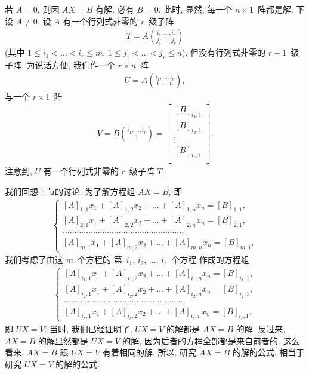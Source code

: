 若 \(A = 0\),
则因 \(AX = B\) 有解,
必有 \(B = 0\).
此时, 显然, 每一个 \(n \times 1\)~阵都是解.
下设 \(A \neq 0\).
设 \(A\) 有一个行列式非零的 \(r\)~级子阵
\begin{align*}
    T = A\binom{i_1,\dots,i_r}{j_1,\dots,j_r}
\end{align*}
(其中
\(1 \leq i_1 < \dots < i_r \leq m\),
\(1 \leq j_1 < \dots < j_r \leq n\)),
但没有行列式非零的 \(r+1\)~级子阵.
为说话方便, 我们作一个 \(r \times n\)~阵
\begin{align*}
    U = A\binom{i_1,\dots,i_r}{1,\dots,n},
\end{align*}
与一个 \(r \times 1\)~阵
\begin{align*}
    V = B\binom{i_1,\dots,i_r}{1}
    =
    \begin{bmatrix}
        [B]_{i_1,1} \\
        [B]_{i_2,1} \\
        \vdots      \\
        [B]_{i_r,1} \\
    \end{bmatrix}.
\end{align*}
注意到, \(U\) 有一个行列式非零的 \(r\)~级子阵 \(T\).

我们回想上节的讨论.
为了解方程组 \(AX = B\), 即
\begin{align*}
    \begin{cases}
        [A]_{1,1} x_1 + [A]_{1,2} x_2 + \dots
        + [A]_{1,n} x_n = [B]_{1,1},
        \\
        [A]_{2,1} x_1 + [A]_{2,2} x_2 + \dots
        + [A]_{2,n} x_n = [B]_{2,1},
        \\
        \dots
        \dots \dots \dots \dots
        \dots \dots \dots \dots
        \dots \dots \dots \dots
        \dots \dots \dots \dots,
        \\
        [A]_{m,1} x_1 + [A]_{m,2} x_2 + \dots
        + [A]_{m,n} x_n = [B]_{m,1},
    \end{cases}
\end{align*}
我们考虑了由这 \(m\)~个方程的%
第~\(i_1\), \(i_2\), \(\dots\), \(i_r\)~个方程%
作成的方程组
\begin{align*}
    \begin{cases}
        [A]_{i_1,1} x_1 + [A]_{i_1,2} x_2 + \dots
        + [A]_{i_1,n} x_n = [B]_{i_1,1},
        \\
        [A]_{i_2,1} x_1 + [A]_{i_2,2} x_2 + \dots
        + [A]_{i_2,n} x_n = [B]_{i_2,1},
        \\
        \dots
        \dots \dots \dots \dots
        \dots \dots \dots \dots
        \dots \dots \dots \dots
        \dots \dots \dots \dots,
        \\
        [A]_{i_r,1} x_1 + [A]_{i_r,2} x_2 + \dots
        + [A]_{i_r,n} x_n = [B]_{i_r,1},
    \end{cases}
\end{align*}
即 \(UX = V\).
当时, 我们已经证明了,
\(UX = V\) 的解都是 \(AX = B\) 的解.
反过来, \(AX = B\) 的解显然都是 \(UX = V\) 的解,
因为后者的方程全部都是来自前者的.
这么看来, \(AX = B\) 跟 \(UX = V\) 有着相同的解.
所以, 研究 \(AX = B\) 的解的公式,
相当于研究 \(UX = V\) 的解的公式.

